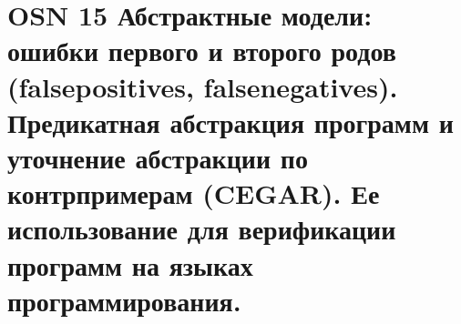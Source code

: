 \section*{OSN 15 Абстрактные модели: ошибки первого и второго родов (falsepositives, falsenegatives). Предикатная абстракция программ и уточнение абстракции по контрпримерам (CEGAR). Ее использование для верификации программ на языках программирования.}
